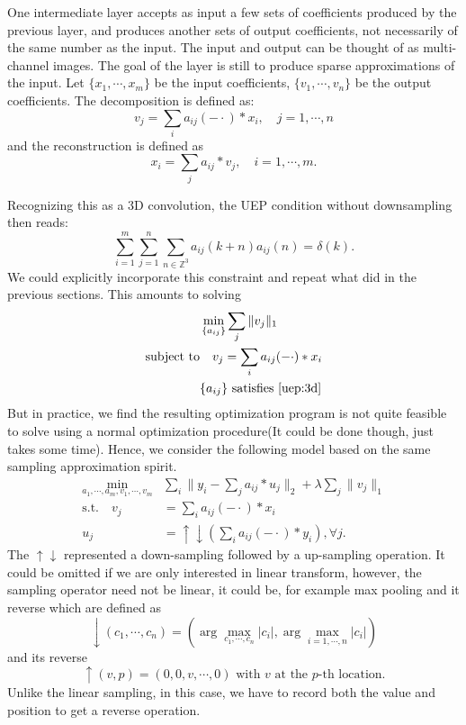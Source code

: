 \documentclass[a4paper]{article}
\begin{document}
One intermediate layer accepts as input a few sets of coefficients produced by the previous layer, and produces another sets of output coefficients, not necessarily of the same number as the input. The input and output can be thought of as multi-channel images. The goal of the layer is still to produce sparse approximations of the input. Let $\{x_1,\cdots,x_m\}$ be the input coefficients, $\{v_1,\cdots,v_n\}$ be the output coefficients. The decomposition is defined as:
\begin{equation}
	v_j = \sum_i a_{ij}(-\cdot)*x_i,\quad j=1,\cdots,n
\end{equation}
and the reconstruction is defined as 
\begin{equation}
	x_i = \sum_j a_{ij}*v_j, \quad i=1,\cdots, m.
\end{equation}

Recognizing this as a 3D convolution, the UEP condition without downsampling then reads:
\begin{equation}
\label{uep:3d}
	\sum_{i=1}^m\sum_{j=1}^n  \sum_{n\in \mathbb{Z}^3} a_{ij}(k+n)a_{ij}(n) = \delta(k).
\end{equation}
We could explicitly incorporate this constraint and repeat what did in the previous sections. This amounts to solving
\begin{equation}
	\begin{aligned}
		&\min_{ \{a_{ij}\} } \sum_j \|v_j\|_1 \\
		\textrm{subject to} &\quad v_j = \sum_i a_{ij}(-\cdot)*x_i \\
			&\{a_{ij}\} \textrm{ satisfies \eqref{uep:3d}} \\
	\end{aligned}
\end{equation}
 But in practice, we find the resulting optimization program is not quite feasible to solve using a normal optimization procedure(It could be done though, just takes some time). Hence, we consider the following model based on the same sampling approximation spirit.
\begin{equation}
\label{eq:m3}
\begin{aligned}
	\min_{a_1,\cdots,a_m, v_1,\cdots,v_m}& \sum_i \|y_i - \sum_j a_{ij}*u_j\|_2 +\lambda \sum_j \|v_j\|_1 \\
	 \textrm{s.t.}  \quad v_j& = \sum_{i} a_{ij}(-\cdot)*x_i \\
		u_j&=\uparrow\downarrow(\sum_i a_{ij}(-\cdot)*y_i), \forall j.
	\end{aligned}
\end{equation}
The $\uparrow \downarrow$ represented a down-sampling followed by a up-sampling operation. It could be omitted if we are only interested in linear transform, however, the sampling operator need not be linear, it could be, for example max pooling and it reverse which are defined as 
\[
	\downarrow(c_1,\cdots,c_n) = (\arg\max_{c_1,\cdots,c_n} |c_i|, \arg\max_{i=1,\cdots,n} |c_i|)
\]
and its reverse
\[
	\uparrow(v,p)=(0,0,v,\cdots,0) \textrm{ with $v$ at the $p$-th location}.
\]
Unlike the linear sampling, in this case, we have to record both the value and position to get a reverse operation.
\end{document}
